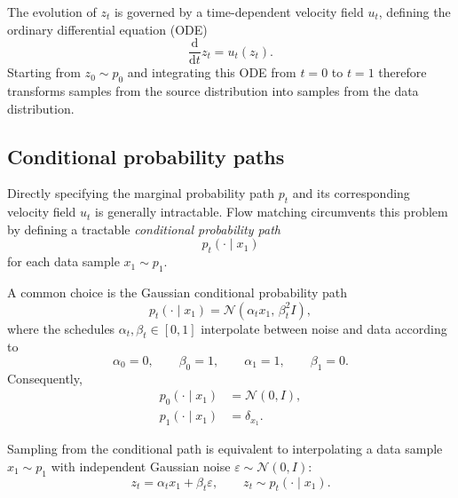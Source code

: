 The evolution of \(z_t\) is governed by a time-dependent velocity field
\(u_t\), defining the ordinary differential equation (ODE)
\begin{equation}
    \frac{\mathrm{d}}{\mathrm{d}t} z_t
    =
    u_t(z_t).
    \label{eq:flow-ode}
\end{equation}
Starting from \(z_0\sim p_0\) and integrating this ODE from \(t=0\) to \(t=1\)
therefore transforms samples from the source distribution into samples from
the data distribution.



\subsection{Conditional probability paths}

Directly specifying the marginal probability path \(p_t\) and its corresponding
velocity field \(u_t\) is generally intractable.
Flow matching circumvents this problem by defining a tractable
\emph{conditional probability path}
\[
    p_t(\cdot\mid x_1)
\]
for each data sample \(x_1\sim p_1\).

A common choice is the Gaussian conditional probability path
\begin{equation}
    p_t(\cdot\mid x_1)
    =
    \mathcal{N}
    \left(
        \alpha_t x_1,\,
        \beta_t^2 I
    \right),
    \label{eq:gaussian-probability-path}
\end{equation}
where the schedules \(\alpha_t,\beta_t\in[0,1]\) interpolate between noise and
data according to
\[
    \alpha_0=0,
    \qquad
    \beta_0=1,
    \qquad
    \alpha_1=1,
    \qquad
    \beta_1=0.
\]
Consequently,
\begin{align}
    p_0(\cdot\mid x_1)
    &= \mathcal{N}(0,I),
    \\
    p_1(\cdot\mid x_1)
    &= \delta_{x_1}.
\end{align}

Sampling from the conditional path is equivalent to interpolating a data
sample \(x_1\sim p_1\) with independent Gaussian noise
\(\varepsilon\sim\mathcal{N}(0,I)\):
\begin{equation}
    z_t
    =
    \alpha_t x_1
    +
    \beta_t \varepsilon,
    \qquad
    z_t \sim p_t(\cdot\mid x_1).
    \label{eq:gaussian-interpolation}
\end{equation}


